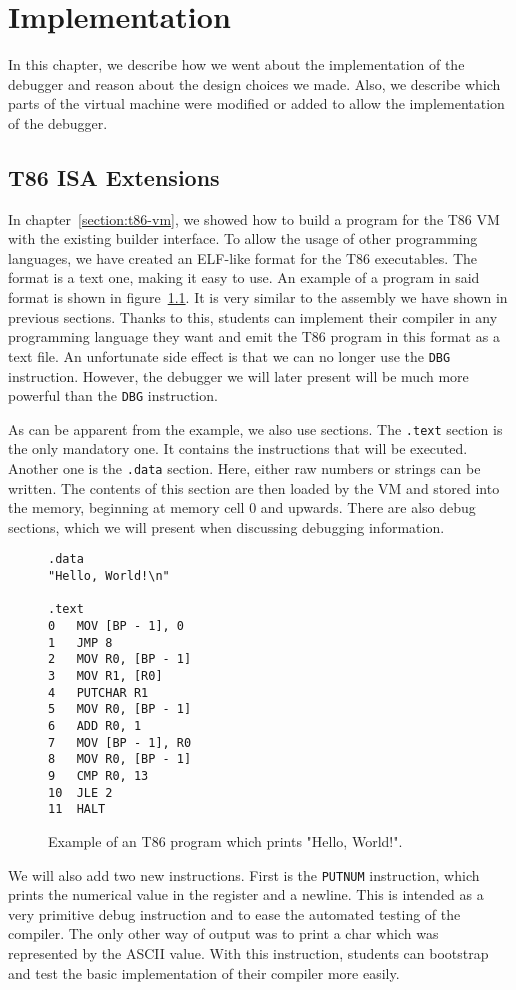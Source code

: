 \chapter{Implementation}
In this chapter, we describe how we went about the implementation of the
debugger and reason about the design choices we made. Also, we describe which
parts of the virtual machine were modified or added to allow the
implementation of the debugger.

\section{T86 ISA Extensions}\label{section:parser}
In chapter~\ref{section:t86-vm}, we showed how to build a program for the T86
VM with the existing builder interface. To allow the usage of other programming
languages, we have created an ELF-like format for the T86 executables. The
format is a text one, making it easy to use. An example of a program in said
format is shown in figure~\ref{fig:t86-program}. It is very similar to the
assembly we have shown in previous sections. Thanks to this, students can
implement their compiler in any programming language they want and emit the T86
program in this format as a text file. An unfortunate side effect is that we
can no longer use the \texttt{DBG} instruction. However, the debugger we will
later present will be much more powerful than the \texttt{DBG} instruction.

As can be apparent from the example, we also use sections. The \texttt{.text}
section is the only mandatory one. It contains the instructions that will be
executed. Another one is the \texttt{.data} section. Here, either raw numbers
or strings can be written. The contents of this section are then loaded by the
VM and stored into the memory, beginning at memory cell 0 and upwards. There
are also debug sections, which we will present when discussing debugging
information.

\begin{figure}
    \begin{lstlisting}
.data
"Hello, World!\n"

.text
0   MOV [BP - 1], 0
1   JMP 8
2   MOV R0, [BP - 1]
3   MOV R1, [R0]
4   PUTCHAR R1
5   MOV R0, [BP - 1]
6   ADD R0, 1
7   MOV [BP - 1], R0
8   MOV R0, [BP - 1]
9   CMP R0, 13
10  JLE 2
11  HALT
    \end{lstlisting}
    \caption{Example of an T86 program which prints "Hello, World!".}
    \label{fig:t86-program}
\end{figure}
We will also add two new instructions. First is the \texttt{PUTNUM}
instruction, which prints the numerical value in the register and a newline.
This is intended as a very primitive debug instruction and to ease the
automated testing of the compiler. The only other way of output was to print a
char which was represented by the ASCII value. With this instruction, students
can bootstrap and test the basic implementation of their compiler more easily.

